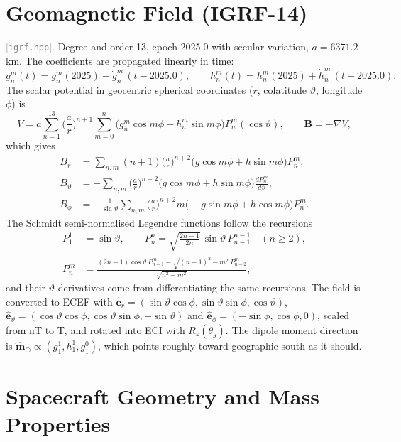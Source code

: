 \documentclass[11pt,a4paper]{article}
\newcommand{\vb}[1]{\boldsymbol{#1}}
\newcommand{\uv}[1]{\hat{\boldsymbol{#1}}}
\newcommand{\src}[1]{\textcolor{gray}{\small[\texttt{#1}]}}
\begin{document}
\section{Geomagnetic Field (IGRF-14)}
\src{igrf.hpp}. Degree and order 13, epoch 2025.0 with secular variation, $a = 6371.2$\,km. The coefficients are propagated linearly in time:
\begin{equation}
g_n^m(t) = g_n^m(2025) + \dot g_n^m\,(t - 2025.0),\qquad h_n^m(t) = h_n^m(2025) + \dot h_n^m\,(t-2025.0).
\end{equation}
The scalar potential in geocentric spherical coordinates ($r$, colatitude $\vartheta$, longitude $\phi$) is
\begin{equation}
V = a\sum_{n=1}^{13}\Big(\frac{a}{r}\Big)^{n+1}\sum_{m=0}^{n}\big(g_n^m\cos m\phi + h_n^m\sin m\phi\big)P_n^m(\cos\vartheta),\qquad \vb B = -\nabla V,
\end{equation}
which gives
\begin{align}
B_r &= \sum_{n,m}(n+1)\Big(\frac{a}{r}\Big)^{n+2}\big(g\cos m\phi + h\sin m\phi\big)P_n^m,\\
B_\vartheta &= -\sum_{n,m}\Big(\frac{a}{r}\Big)^{n+2}\big(g\cos m\phi + h\sin m\phi\big)\frac{dP_n^m}{d\vartheta},\\
B_\phi &= -\frac{1}{\sin\vartheta}\sum_{n,m}\Big(\frac{a}{r}\Big)^{n+2} m\big(-g\sin m\phi + h\cos m\phi\big)P_n^m .
\end{align}
The Schmidt semi-normalised Legendre functions follow the recursions
\begin{align}
P_1^1 &= \sin\vartheta,\qquad P_n^n = \sqrt{\tfrac{2n-1}{2n}}\,\sin\vartheta\,P_{n-1}^{n-1}\quad(n\ge2),\\
P_n^m &= \frac{(2n-1)\cos\vartheta\,P_{n-1}^m - \sqrt{(n-1)^2-m^2}\,P_{n-2}^m}{\sqrt{n^2-m^2}},
\end{align}
and their $\vartheta$-derivatives come from differentiating the same recursions. The field is converted to ECEF with $\uv e_r = (\sin\vartheta\cos\phi, \sin\vartheta\sin\phi, \cos\vartheta)$, $\uv e_\vartheta = (\cos\vartheta\cos\phi, \cos\vartheta\sin\phi, -\sin\vartheta)$ and $\uv e_\phi = (-\sin\phi, \cos\phi, 0)$, scaled from nT to T, and rotated into ECI with $R_z(\theta_g)$. The dipole moment direction is $\uv m_\oplus \propto (g_1^1, h_1^1, g_1^0)$, which points roughly toward geographic south as it should.

\section{Spacecraft Geometry and Mass Properties}
\end{document}
